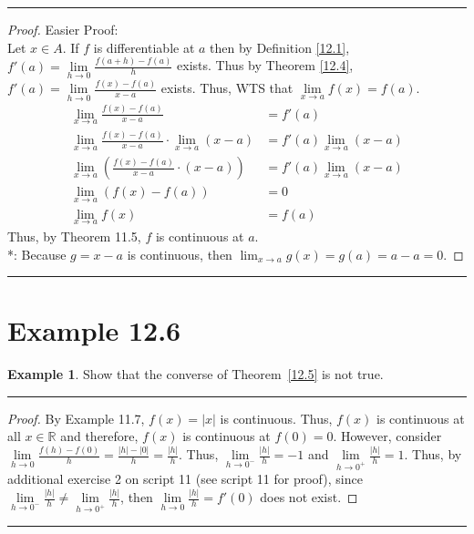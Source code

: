 \documentclass[openany, amssymb, psamsfonts]{amsart}
\newcommand{\bbR}{\mathbb{R}}
\theoremstyle{definition}
\newtheorem{exmp}{Example}[section]
\numberwithin{equation}{section}
\begin{document}
\vspace{4pt}     \hrule   \vspace{4pt} \begin{proof} Easier Proof:\\
Let $x\in A$. If $f$ is differentiable at $a$ then by Definition \ref{12.1}, $f'(a) = \lim\limits_{h\to 0} \frac{f(a+h) - f(a)}{h}$ exists. Thus by Theorem \ref{12.4}, $f'(a) = \lim\limits_{h\to 0} \frac{f(x) - f(a)}{x-a}$ exists. Thus, WTS that $\lim\limits_{x\to a}f(x) = f(a)$. 
\begin{align*}
    \lim\limits_{x\to a}\frac{f(x)- f(a)}{x-a} &= f'(a)\\
    \lim\limits_{x\to a}\frac{f(x)- f(a)}{x-a} \cdot \lim\limits_{x\to a}(x-a)&= f'(a) \lim\limits_{x\to a}(x-a)\\
    \tag{Theorem 11.9} \lim\limits_{x\to a} (\frac{f(x)- f(a)}{x-a} \cdot (x-a)) &= f'(a)\lim\limits_{x\to a}(x-a)\\
\tag{Evaluating RHS*}    \lim\limits_{x\to a} (f(x) - f(a)) &= 0\\
\tag{Theorem 11.12} \lim\limits_{x\to a}f(x) &= f(a)
\end{align*}
Thus, by Theorem 11.5, $f$ is continuous at $a$.\\
*: Because $g = x-a$ is continuous, then $\lim_{x\to a}g(x) = g(a) = a-a = 0$.
\end{proof} \vspace{4pt}     \hrule   \vspace{4pt}

\section*{Example 12.6}
\begin{exmp}
	Show that the converse of Theorem~\ref{12.5} is not true.
\end{exmp}
\vspace{4pt}     \hrule   \vspace{4pt} \begin{proof}
By Example 11.7, $f(x) = |x|$ is continuous. Thus, $f(x)$ is continuous at all $x\in \bbR$ and therefore, $f(x)$ is continuous at $f(0) = 0$. However, consider $\lim\limits_{h\to 0} \frac{f(h) - f(0)}{h} = \frac{|h| - |0|}{h} = \frac{|h|}{h}$. Thus, $\lim\limits_{h\to 0^-}\frac{|h|}{h} = -1$ and $\lim\limits_{h\to 0^+}\frac{|h|}{h}= 1$. Thus, by additional exercise 2 on script 11 (see script 11 for proof), since $\lim\limits_{h\to 0^-}\frac{|h|}{h} \neq \lim\limits_{h\to 0^+}\frac{|h|}{h}$, then $\lim\limits_{h\to 0}\frac{|h|}{h} = f'(0)$ does not exist.
\end{proof} \vspace{4pt}     \hrule   \vspace{4pt}
\end{document}
